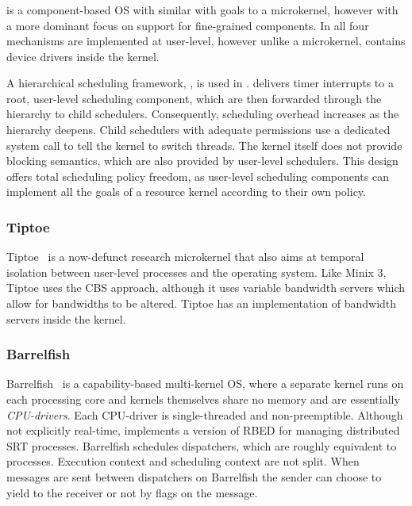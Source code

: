 \subsubsection{\composite} 

\composite is a component-based \gls{OS} with similar with goals to a microkernel,
however with a more dominant focus on support for fine-grained components.  In \composite all four
mechanisms are implemented at user-level, however unlike a microkernel, \composite contains device
drivers inside the kernel.

A hierarchical scheduling framework, \hires\citep{Parmer_West_11}, is used in \composite.  \hires
delivers timer interrupts to a root, user-level scheduling component, which are then forwarded
through the hierarchy to child schedulers.  Consequently, scheduling overhead increases as the
hierarchy deepens.  Child schedulers with adequate permissions use a dedicated system call to tell
the kernel to switch threads.  The kernel itself does not provide blocking semantics, which are also
provided by user-level schedulers.  This design offers total scheduling policy freedom, as
user-level scheduling components can implement all the goals of a resource kernel according to
their own policy.
 
\subsubsection{Tiptoe}

Tiptoe~\citep{Craciunas_KPRS_09} is a now-defunct research microkernel that also aims at
temporal isolation between user-level processes and the operating system.  Like {\sc Minix 3},
Tiptoe uses the \gls{CBS} approach, although it uses variable bandwidth servers which allow for
bandwidths to be altered.  Tiptoe has an implementation of bandwidth servers inside the kernel.

\subsubsection{Barrelfish}

Barrelfish~\citep{Peter_SBBIHR_10} is a capability-based multi-kernel \gls{OS}, where a separate kernel runs on each processing core and kernels themselves share no memory and are essentially \emph{\gls{CPU}-drivers}.
Each CPU-driver is single-threaded and non-preemptible. 
Although not explicitly real-time, implements a version of \gls{RBED} for managing distributed \gls{SRT} processes.
Barrelfish schedules dispatchers, which are roughly equivalent to processes. 
Execution context and scheduling context are not split.
When messages are sent between dispatchers on Barrelfish the sender can choose to yield to the receiver or not by flags on the message.

